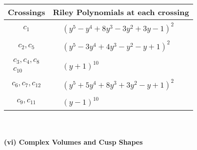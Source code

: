 \documentclass[1p]{elsarticle_modified}
\theoremstyle{definition}
\begin{document}
\begin{tabular}{m{50pt}|m{274pt}}
Crossings & \hspace{64pt}Riley Polynomials at each crossing \\
\hline $$\begin{aligned}c_{1}\end{aligned}$$&$\begin{aligned}
&(y^5- y^4+8 y^3-3 y^2+3 y-1)^2
\end{aligned}$\\
\hline $$\begin{aligned}c_{2},c_{5}\end{aligned}$$&$\begin{aligned}
&(y^5-3 y^4+4 y^3- y^2- y+1)^2
\end{aligned}$\\
\hline $$\begin{aligned}c_{3},c_{4},c_{8}\\c_{10}\end{aligned}$$&$\begin{aligned}
&(y+1)^{10}
\end{aligned}$\\
\hline $$\begin{aligned}c_{6},c_{7},c_{12}\end{aligned}$$&$\begin{aligned}
&(y^5+5 y^4+8 y^3+3 y^2- y+1)^2
\end{aligned}$\\
\hline $$\begin{aligned}c_{9},c_{11}\end{aligned}$$&$\begin{aligned}
&(y-1)^{10}
\end{aligned}$\\
\hline
\end{tabular}\\~\\
\newpage\flushleft \textbf{(vi) Complex Volumes and Cusp Shapes}
\end{document}
